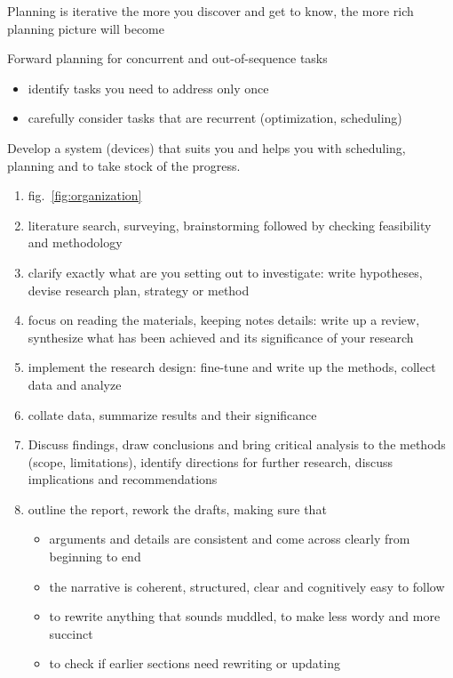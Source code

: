 \documentclass[10pt,a4paper,twocolumn]{article}
\begin{document}
Planning is iterative the more you discover and get to know, the more rich planning picture will become

Forward planning for concurrent and out-of-sequence tasks
\begin{itemize}
  \item identify tasks you need to address only once
  \item carefully consider tasks that are recurrent (optimization, scheduling)
\end{itemize}

Develop a system (devices) that suits you and helps you with scheduling, planning and to
take stock of the progress.
\begin{enumerate}
  \item fig.~\ref{fig:organization}
  \item literature search, surveying, brainstorming followed by checking feasibility
  and methodology
  \item clarify exactly what are you setting out to investigate: write hypotheses, devise
  research plan, strategy or method
  \item focus on reading the materials, keeping notes details: write up a review, synthesize
  what has been achieved and its significance of your research
  \item implement the research design: fine-tune and write up the methods, collect data
  and analyze
  \item collate data, summarize results and their significance
  \item Discuss findings, draw conclusions and bring critical analysis to the methods
  (scope, limitations), identify directions for further research, discuss implications and
  recommendations
  \item outline the report, rework the drafts, making sure that
  \begin{itemize}
    \item arguments and details are consistent and come across clearly from beginning to end
    \item the narrative is coherent, structured, clear and cognitively easy to follow
    \item to rewrite anything that sounds muddled, to make less wordy and more succinct
    \item to check if earlier sections need rewriting or updating
  \end{itemize}
\end{enumerate}
\end{document}
